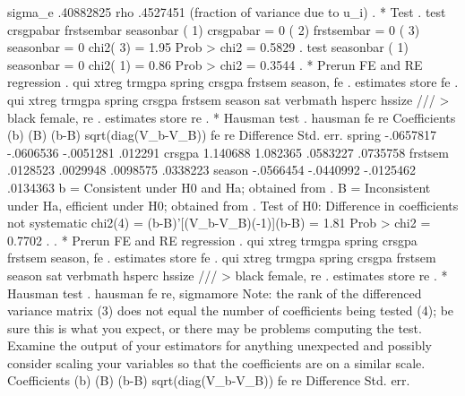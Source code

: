     sigma_e {\VBAR}  .40882825
         rho {\VBAR}   .4527451   (fraction of variance due to u_i)
{\smallskip}
. * Test
. test crsgpabar frstsembar seasonbar
{\smallskip}
 ( 1)  crsgpabar = 0
 ( 2)  frstsembar = 0
 ( 3)  seasonbar = 0
{\smallskip}
           chi2(  3) =    1.95
         Prob > chi2 =    0.5829
{\smallskip}
. test seasonbar
{\smallskip}
 ( 1)  seasonbar = 0
{\smallskip}
           chi2(  1) =    0.86
         Prob > chi2 =    0.3544
{\smallskip}
. * Prerun FE and RE regression
. qui xtreg trmgpa spring crsgpa frstsem season, fe
{\smallskip}
. estimates store fe
{\smallskip}
. qui xtreg trmgpa spring crsgpa frstsem season sat verbmath hsperc hssize ///
> black female, re
{\smallskip}
. estimates store re
{\smallskip}
. * Hausman test
. hausman fe re 
{\smallskip}
                  Coefficients 
             {\VBAR}      (b)          (B)            (b-B)     sqrt(diag(V_b-V_B))
             {\VBAR}       fe           re         Difference       Std. err.
      spring {\VBAR}   -.0657817    -.0606536       -.0051281         .012291
      crsgpa {\VBAR}    1.140688     1.082365        .0583227        .0735758
     frstsem {\VBAR}    .0128523     .0029948        .0098575        .0338223
      season {\VBAR}   -.0566454    -.0440992       -.0125462        .0134363
                          b = Consistent under H0 and Ha; obtained from {}.
           B = Inconsistent under Ha, efficient under H0; obtained from {}.
{\smallskip}
Test of H0: Difference in coefficients not systematic
{\smallskip}
    chi2(4) = (b-B)'[(V_b-V_B){\caret}(-1)](b-B)
            =   1.81
Prob > chi2 = 0.7702
{\smallskip}
. 
. * Prerun FE and RE regression
. qui xtreg trmgpa spring crsgpa frstsem season, fe
{\smallskip}
. estimates store fe
{\smallskip}
. qui xtreg trmgpa spring crsgpa frstsem season sat verbmath hsperc hssize ///
> black female, re
{\smallskip}
. estimates store re
{\smallskip}
. * Hausman test
. hausman fe re, sigmamore
{\smallskip}
Note: the rank of the differenced variance matrix (3) does not equal the number of coefficients being tested (4); be sure this is what you expect, or there may be problems computing the test.  Examine the output of your estimators for anything
        unexpected and possibly consider scaling your variables so that the coefficients are on a similar scale.
{\smallskip}
                  Coefficients 
             {\VBAR}      (b)          (B)            (b-B)     sqrt(diag(V_b-V_B))
             {\VBAR}       fe           re         Difference       Std. err.
